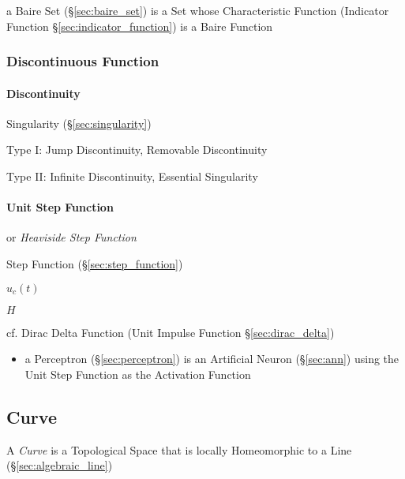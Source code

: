 a Baire Set (\S\ref{sec:baire_set}) is a Set whose Characteristic Function
(Indicator Function \S\ref{sec:indicator_function}) is a Baire Function




\subsubsection{Discontinuous Function}\label{sec:discontinuous_function}

\paragraph{Discontinuity}\label{sec:discontinuity}\hfill

\fist Singularity (\S\ref{sec:singularity})

Type I: Jump Discontinuity, Removable Discontinuity

Type II: Infinite Discontinuity, Essential Singularity



\paragraph{Unit Step Function}\label{sec:unit_step_function}\hfill

or \emph{Heaviside Step Function}

Step Function (\S\ref{sec:step_function})

$u_c(t)$

$H$

cf. Dirac Delta Function (Unit Impulse Function \S\ref{sec:dirac_delta})

\begin{itemize}
  \item a Perceptron (\S\ref{sec:perceptron}) is an Artificial Neuron
    (\S\ref{sec:ann}) using the Unit Step Function as the Activation Function
\end{itemize}



\subsection{Curve}\label{sec:curve}

A \emph{Curve} is a Topological Space that is locally Homeomorphic to a Line
(\S\ref{sec:algebraic_line})

